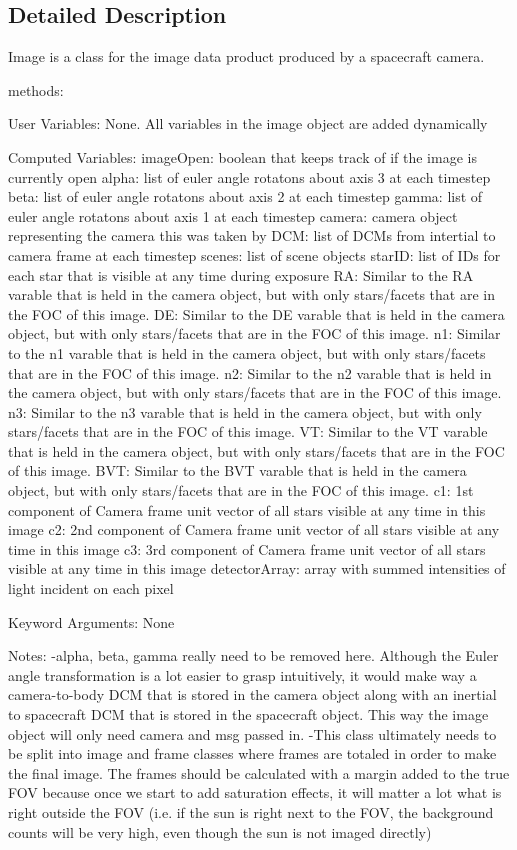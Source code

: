 \subsection{Detailed Description}
Image is a class for the image data product produced by a spacecraft camera. 

methods\+:

User Variables\+: None. All variables in the image object are added dynamically

Computed Variables\+: image\+Open\+: boolean that keeps track of if the image is currently open alpha\+: list of euler angle rotatons about axis 3 at each timestep beta\+: list of euler angle rotatons about axis 2 at each timestep gamma\+: list of euler angle rotatons about axis 1 at each timestep camera\+: camera object representing the camera this was taken by D\+CM\+: list of D\+C\+Ms from intertial to camera frame at each timestep scenes\+: list of scene objects star\+ID\+: list of I\+Ds for each star that is visible at any time during exposure RA\+: Similar to the RA varable that is held in the camera object, but with only stars/facets that are in the F\+OC of this image. DE\+: Similar to the DE varable that is held in the camera object, but with only stars/facets that are in the F\+OC of this image. n1\+: Similar to the n1 varable that is held in the camera object, but with only stars/facets that are in the F\+OC of this image. n2\+: Similar to the n2 varable that is held in the camera object, but with only stars/facets that are in the F\+OC of this image. n3\+: Similar to the n3 varable that is held in the camera object, but with only stars/facets that are in the F\+OC of this image. VT\+: Similar to the VT varable that is held in the camera object, but with only stars/facets that are in the F\+OC of this image. B\+VT\+: Similar to the B\+VT varable that is held in the camera object, but with only stars/facets that are in the F\+OC of this image. c1\+: 1st component of Camera frame unit vector of all stars visible at any time in this image c2\+: 2nd component of Camera frame unit vector of all stars visible at any time in this image c3\+: 3rd component of Camera frame unit vector of all stars visible at any time in this image detector\+Array\+: array with summed intensities of light incident on each pixel

Keyword Arguments\+: None

Notes\+: -\/alpha, beta, gamma really need to be removed here. Although the Euler angle transformation is a lot easier to grasp intuitively, it would make way a camera-\/to-\/body D\+CM that is stored in the camera object along with an inertial to spacecraft D\+CM that is stored in the spacecraft object. This way the image object will only need camera and msg passed in. -\/\+This class ultimately needs to be split into image and frame classes where frames are totaled in order to make the final image. The frames should be calculated with a margin added to the true F\+OV because once we start to add saturation effects, it will matter a lot what is right outside the F\+OV (i.\+e. if the sun is right next to the F\+OV, the background counts will be very high, even though the sun is not imaged directly) 

